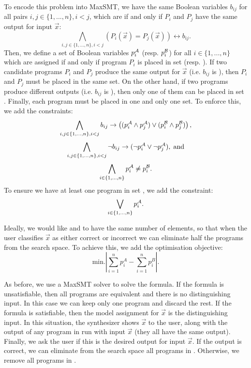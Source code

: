To encode this problem into \ac{MaxSMT}, we have the same Boolean variables \(b_{ij}\) for all pairs \(i,j \in \{1, ..., n\}, i < j\), which are \true if and only if \(P_i\) and \(P_j\) have the same output for input \(\vec{x}\):
\begin{equation}
    \bigwedge_{i,j \in \{1, ..., n\}, i < j} (P_i(\vec{x}) = P_j(\vec{x})) \leftrightarrow b_{ij}.
\end{equation}
%
Then, we define a set of Boolean variables \(p_i^{\mathcal{A}}\) (resp. \(p_i^{\mathcal{B}}\)) for all \(i\in \{1, ..., n\}\) which are assigned \true if and only if program \(P_i\) is placed in set  (resp. ).
%
If two candidate programs \(P_i\) and \(P_j\) produce the same output for \(\vec{x}\) (i.e. \(b_{ij}\) is \true), then \(P_i\) and \(P_j\) must be placed in the same set. On the other hand, if two programs produce different outputs (i.e. \(b_{ij}\) is \false), then only one of them can be placed in set . Finally, each program must be placed in one and only one set. To enforce this, we add the constraints:
\begin{equation}
    \bigwedge_{i,j \in \{1, ..., n\}, i < j} b_{ij} \rightarrow \left( (p_i^{\mathcal{A}} \wedge p_j^{\mathcal{A}}) \vee (p_i^{\mathcal{B}} \wedge p_j^{\mathcal{B}}) \right),
\end{equation}
%
\begin{equation}
    \bigwedge_{i,j \in \{1, ..., n\}, i < j} \neg b_{ij} \rightarrow (\neg p_i^{\mathcal{A}} \vee \neg p_j^{\mathcal{A}}), \; \textrm{and}
\end{equation}
%
\begin{equation}
    \bigwedge_{i \in \{1, ..., n\}} p_i^{\mathcal{A}} \ne p_i^{\mathcal{B}}.
\end{equation}
%
To ensure we have at least one program in set , we add the constraint:
\begin{equation}
    \bigvee_{i \in \{1, ..., n\}} p_i^{\mathcal{A}}.
\end{equation}

\noindent
Ideally, we would like  and  to have the same number of elements, so that when the user classifies \(\vec{x}\) as either correct or incorrect we can eliminate half the programs from the search space. To achieve this, we add the optimisation objective:
\begin{equation}
    \textrm{min.} \left|\sum_{i=1}^n p_i^A - \sum_{i=1}^n p_i^B \right|.
\end{equation}

As before, we use a \ac{MaxSMT} solver to solve the formula.
If the formula is unsatisfiable, then all programs are equivalent and there is no distinguishing input. In this case we can keep only one program and discard the rest.
If the formula is satisfiable, then the model assignment for \(\vec{x}\) is the distinguishing input. In this situation, the synthesizer shows \(\vec{x}\) to the user, along with the output of any program in  run with input \(\vec{x}\) (they all have the same output).
Finally, we ask the user if this is the desired output for input \(\vec{x}\). If the output is correct, we can eliminate from the search space all programs in . Otherwise, we remove all programs in .

